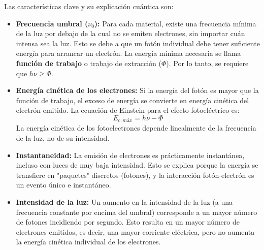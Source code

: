 Las características clave y su explicación cuántica son:
\begin{itemize}
    \item \textbf{Frecuencia umbral ($\nu_0$):} Para cada material, existe una frecuencia mínima de la luz por debajo de la cual no se emiten electrones, sin importar cuán intensa sea la luz. Esto se debe a que un fotón individual debe tener suficiente energía para arrancar un electrón. La energía mínima necesaria se llama \textbf{función de trabajo} o trabajo de extracción ($\Phi$). Por lo tanto, se requiere que $h\nu \ge \Phi$.
    \item \textbf{Energía cinética de los electrones:} Si la energía del fotón es mayor que la función de trabajo, el exceso de energía se convierte en energía cinética del electrón emitido. La ecuación de Einstein para el efecto fotoeléctrico es:
    $$ E_{c, máx} = h\nu - \Phi $$
    La energía cinética de los fotoelectrones depende linealmente de la frecuencia de la luz, no de su intensidad.
    \item \textbf{Instantaneidad:} La emisión de electrones es prácticamente instantánea, incluso con luces de muy baja intensidad. Esto se explica porque la energía se transfiere en "paquetes" discretos (fotones), y la interacción fotón-electrón es un evento único e instantáneo.
    \item \textbf{Intensidad de la luz:} Un aumento en la intensidad de la luz (a una frecuencia constante por encima del umbral) corresponde a un mayor número de fotones incidiendo por segundo. Esto resulta en un mayor número de electrones emitidos, es decir, una mayor corriente eléctrica, pero no aumenta la energía cinética individual de los electrones.
\end{itemize}


